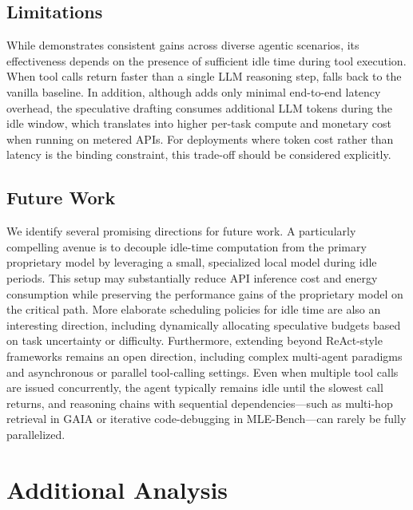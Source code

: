 \subsection{Limitations}
\label{sec:appendix_limitations}
While \methodname{} demonstrates consistent gains across diverse agentic scenarios, 
its effectiveness depends on the presence of sufficient idle time during tool 
execution. When tool calls return faster than a single LLM reasoning step, 
\methodname{} falls back to the vanilla baseline. In addition, although 
\methodname{} adds only minimal end-to-end latency overhead, the speculative 
drafting consumes additional LLM tokens during the idle window, which translates 
into higher per-task compute and monetary cost when running on metered APIs. 
For deployments where token cost rather than latency is the binding constraint, 
this trade-off should be considered explicitly.

\subsection{Future Work}
\label{sec:appendix_future_work}
We identify several promising directions for future work. A particularly 
compelling avenue is to decouple idle-time computation from the primary 
proprietary model by leveraging a small, specialized local model during 
idle periods. This setup may substantially reduce API inference cost and 
energy consumption while preserving the performance gains of the proprietary 
model on the critical path. More elaborate scheduling policies for idle time 
are also an interesting direction, including dynamically allocating speculative 
budgets based on task uncertainty or difficulty. Furthermore, extending 
\methodname{} beyond ReAct-style frameworks remains an open direction, 
including complex multi-agent paradigms and asynchronous or parallel 
tool-calling settings. Even when multiple tool calls are issued concurrently, 
the agent typically remains idle until the slowest call returns, and reasoning 
chains with sequential dependencies---such as multi-hop retrieval in GAIA or 
iterative code-debugging in MLE-Bench---can rarely be fully parallelized.








\section{Additional Analysis}
\label{sec:appendix_additional_analysis}


